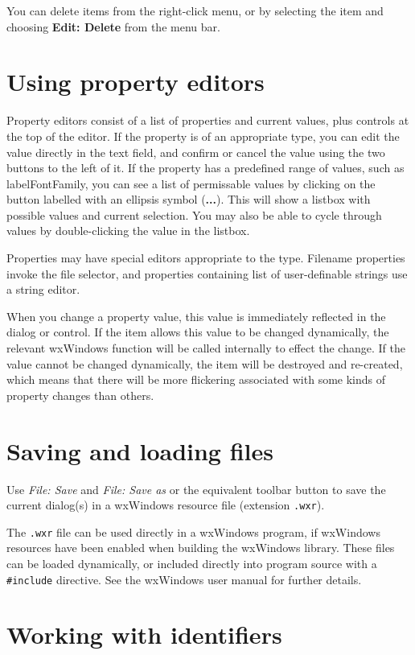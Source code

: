 You can delete items from the right-click menu, or by selecting the item and
choosing {\bf Edit: Delete} from the menu bar.

\section{Using property editors}\label{propeditors}

Property editors consist of a list of properties and current values, plus controls at the top of
the editor. If the property is of an appropriate type, you can edit the value directly in the
text field, and confirm or cancel the value using the two buttons to the left of it.
If the property has a predefined range of values, such as labelFontFamily, you can
see a list of permissable values by clicking on the button labelled with an ellipsis symbol ({\bf ...}).
This will show a listbox with possible values and current selection. You may also be able
to cycle through values by double-clicking the value in the listbox.

Properties may have special editors appropriate to the type. Filename properties invoke
the file selector, and properties containing list of user-definable strings use a
string editor.

When you change a property value, this value is immediately reflected in
the dialog or control.  If the item allows this value to be changed
dynamically, the relevant wxWindows function will be called internally
to effect the change.  If the value cannot be changed dynamically, the
item will be destroyed and re-created, which means that there will be
more flickering associated with some kinds of property changes than
others.

\section{Saving and loading files}

Use {\it File: Save} and {\it File: Save as} or the equivalent toolbar button
to save the current dialog(s) in a wxWindows resource file (extension {\tt .wxr}).

The {\tt .wxr} file can be used directly in a wxWindows program, if
wxWindows resources have been enabled when building the wxWindows library.
These files can be loaded dynamically, or included directly into program source
with a \verb$#include$ directive. See the wxWindows user manual for further details.

\section{Working with identifiers}


